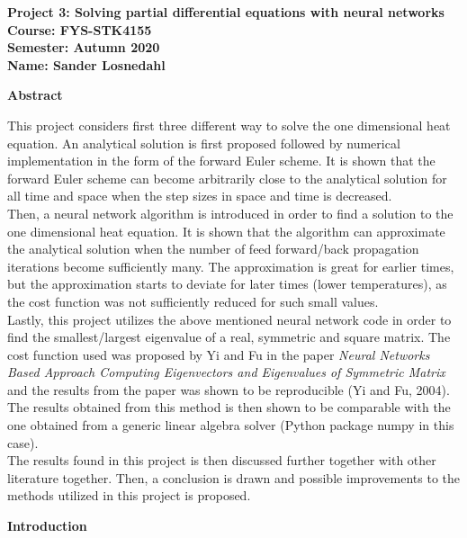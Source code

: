 \documentclass[12pt,a4paper]{article}
\begin{document}
\begin{center}
\LARGE{\textbf{Project 3: Solving partial differential equations with neural networks}}
\\
\large{\textbf{Course: FYS-STK4155}}
\\
\large{\textbf{Semester: Autumn 2020}}
\\
\large{\textbf{Name: Sander Losnedahl}}
\end{center}

\begin{center}
\Large{\textbf{Abstract}}
\end{center}

\noindent This project considers first three different way to solve the one dimensional heat equation. An analytical solution is first proposed followed by numerical implementation in the form of the forward Euler scheme. It is shown that the forward Euler scheme can become arbitrarily close to the analytical solution for all time and space when the step sizes in space and time is decreased. 
\\
Then, a neural network algorithm is introduced in order to find a solution to the one dimensional heat equation. It is shown that the algorithm can approximate the analytical solution when the number of feed forward/back propagation iterations become sufficiently many. The approximation is great for earlier times, but the approximation starts to deviate for later times (lower temperatures), as the cost function was not sufficiently reduced for such small values.
\\
Lastly, this project utilizes the above mentioned neural network code in order to find the smallest/largest eigenvalue of a real, symmetric and square matrix. The cost function used was proposed by Yi and Fu in the paper \emph{Neural Networks Based Approach Computing Eigenvectors and Eigenvalues of Symmetric Matrix} and the results from the paper was shown to be reproducible (Yi and Fu, 2004). The results obtained from this method is then shown to be comparable with the one obtained from a generic linear algebra solver (Python package numpy in this case).
\\
The results found in this project is then discussed further together with other literature together. Then, a conclusion is drawn and possible improvements to the methods utilized in this project is proposed.

\newpage

\begin{center}
\Large{\textbf{Introduction}}
\end{center}
\end{document}
